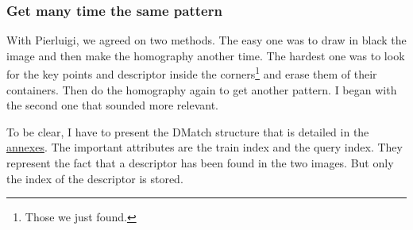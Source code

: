 	\subsubsection[Multiple pattern]{Get many time the same pattern}

	\par With Pierluigi, we agreed on two methods. The easy one was to draw in black the image and then make the homography another time. The hardest one was to look for the key points and descriptor inside the corners\footnote{Those we just found.} and erase them of their containers. Then do the homography again to get another pattern. I began with the second one that sounded more relevant. 
	
	\par To be clear, I have to present the DMatch structure that is detailed in the \hyperlink{structDMatch}{annexes}. The important attributes are the train index and the query index. They represent the fact that a descriptor has been found in the two images. But only the index of the descriptor is stored.
	

